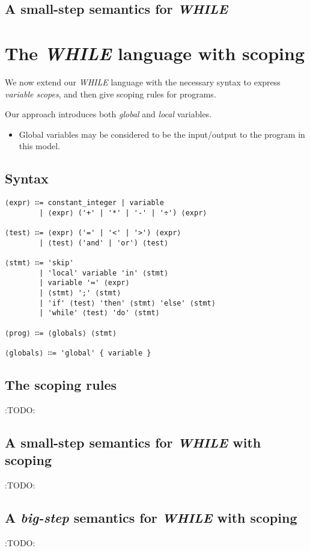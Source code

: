 \documentclass[11pt]{article}
\theoremstyle{definition}
\begin{document}
\subsection{A small-step semantics for \emph{WHILE}}
\label{sec:orgf0c8785}

\section{The \emph{WHILE} language with scoping}
\label{sec:orgc00abd3}
We now extend our \emph{WHILE} language with the necessary syntax
to express \emph{variable scopes}, and then give
scoping rules for programs.

Our approach introduces both \emph{global} and \emph{local} variables.
\begin{itemize}
\item Global variables may be considered to be the input/output to the program
in this model.
\end{itemize}

\subsection{Syntax}
\label{sec:orgc3ff243}

\begin{verbatim}
⟨expr⟩ ∷= constant_integer | variable
        | ⟨expr⟩ ('+' | '*' | '-' | '÷') ⟨expr⟩

⟨test⟩ ∷= ⟨expr⟩ ('=' | '<' | '>') ⟨expr⟩
        | ⟨test⟩ ('and' | 'or') ⟨test⟩

⟨stmt⟩ ∷= 'skip'
        | 'local' variable 'in' ⟨stmt⟩
        | variable '≔' ⟨expr⟩
        | ⟨stmt⟩ ';' ⟨stmt⟩
        | 'if' ⟨test⟩ 'then' ⟨stmt⟩ 'else' ⟨stmt⟩
        | 'while' ⟨test⟩ 'do' ⟨stmt⟩

⟨prog⟩ ∷= ⟨globals⟩ ⟨stmt⟩

⟨globals⟩ ∷= 'global' { variable }
\end{verbatim}

\subsection{The scoping rules}
\label{sec:orgf92d1f4}

:TODO:

\subsection{A small-step semantics for \emph{WHILE} with scoping}
\label{sec:org53cd557}

:TODO:

\subsection{A \emph{big-step} semantics for \emph{WHILE} with scoping}
\label{sec:org79a7913}

:TODO:
\end{document}
